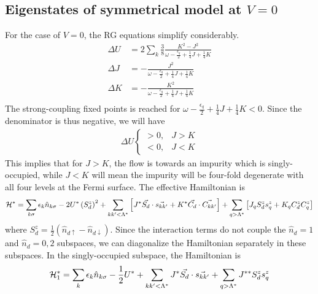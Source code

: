 \documentclass[12pt,twoside]{report}
\numberwithin{equation}{section}
\begin{document}
\subsection{Eigenstates of symmetrical model at \(V=0\)}
For the case of \(V=0\), the RG equations simplify considerably.
\begin{equation}\begin{aligned}
	\Delta U &= 2\sum_k \frac{3}{8}\frac{K^2 - J^2}{\omega - \frac{\epsilon_q}{2} + \frac{1}{4}J + \frac{1}{4}K} \\
	\Delta J &= - \frac{J^2}{\omega - \frac{\epsilon_q}{2} + \frac{1}{4}J + \frac{1}{4}K}\\
	\Delta K &= - \frac{K^2}{\omega - \frac{\epsilon_q}{2} + \frac{1}{4}J + \frac{1}{4}K}\\
\end{aligned}\end{equation}
The strong-coupling fixed points is reached for \(\omega - \frac{\epsilon_q}{2} + \frac{1}{4}J + \frac{1}{4}K < 0\). Since the denominator is thus negative, we will have
\begin{equation}\begin{aligned}
	\Delta U \begin{cases}
		> 0, & J> K \\
		< 0, & J< K
	\end{cases}
\end{aligned}\end{equation}
This implies that for \(J>K\), the flow is towards an impurity which is singly-occupied, while \(J < K\) will mean the impurity will be four-fold degenerate with all four levels at the Fermi surface. 
\pb The effective Hamiltonian is
\begin{equation}\begin{aligned}
	\mathcal{H}^* = \sum_{k\sigma} \epsilon_k \hat n_{k\sigma} - 2 U^* \left(S_d^z\right)^2 + \sum_{kk^\prime < \Lambda^*}\left[J^* \vec{S_d}\cdot\vec{s_{kk^\prime}} + K^* \vec{C_d}\cdot\vec{C_{kk^\prime}}\right] + \sum_{q > \Lambda^*}\left[J_q S_d^z s^z_{q} + K_q C_d^z C^z_{q}\right]
\end{aligned}\end{equation}
where \(S_d^z = \frac{1}{2}\left( \hat n_{d\uparrow} - \hat n_{d \downarrow} \right) \). Since the interaction terms do not couple the \(\hat n_{d}=1\) and \(\hat n_{d}=0,2\) subspaces, we can diagonalize the Hamiltonian separately in these subspaces. 
\pb In the singly-occupied subspace, the Hamiltonian is
\begin{equation}\begin{aligned}
	\mathcal{H}^*_{1} = \sum_k \epsilon_k \hat n_{k\sigma} - \frac{1}{2} U^* + \sum_{kk^\prime < \Lambda^*}J^* \vec{S_d}\cdot\vec{s_{kk^\prime}}+ \sum_{q > \Lambda^*}J^{**} S_d^z s^z_{q}
\end{aligned}\end{equation}
\end{document}
